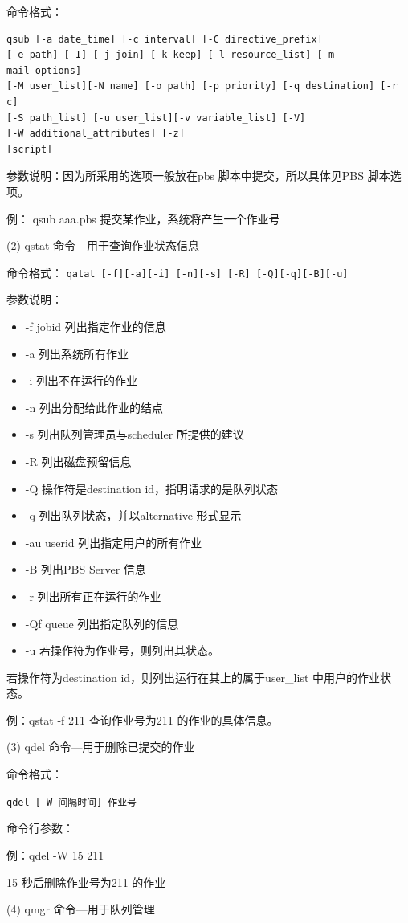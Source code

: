 {命令格式：
\begin{verbatim}
qsub [-a date_time] [-c interval] [-C directive_prefix]
[-e path] [-I] [-j join] [-k keep] [-l resource_list] [-m mail_options]
[-M user_list][-N name] [-o path] [-p priority] [-q destination] [-r c]
[-S path_list] [-u user_list][-v variable_list] [-V]
[-W additional_attributes] [-z]
[script]
\end{verbatim}
参数说明：因为所采用的选项一般放在pbs 脚本中提交，所以具体见PBS 脚本选项。

例： qsub aaa.pbs 提交某作业，系统将产生一个作业号

(2) qstat 命令—用于查询作业状态信息

命令格式：
\verb*|qatat [-f][-a][-i] [-n][-s] [-R] [-Q][-q][-B][-u]|

参数说明：
\begin{itemize}
\item -f jobid 列出指定作业的信息
\item -a 列出系统所有作业
\item -i 列出不在运行的作业
\item -n 列出分配给此作业的结点
\item -s 列出队列管理员与scheduler 所提供的建议
\item -R 列出磁盘预留信息
\item -Q 操作符是destination id，指明请求的是队列状态
\item -q 列出队列状态，并以alternative 形式显示
\item -au userid 列出指定用户的所有作业
\item -B 列出PBS Server 信息
\item -r 列出所有正在运行的作业
\item -Qf queue 列出指定队列的信息
\item -u 若操作符为作业号，则列出其状态。
\end{itemize}

若操作符为destination id，则列出运行在其上的属于user\_list 中用户的作业状态。

例：qstat -f 211 查询作业号为211 的作业的具体信息。


(3) qdel 命令—用于删除已提交的作业

命令格式：

\verb*|qdel [-W 间隔时间] 作业号|

命令行参数：

例：qdel -W 15 211 

15 秒后删除作业号为211 的作业


(4) qmgr 命令—用于队列管理


}
